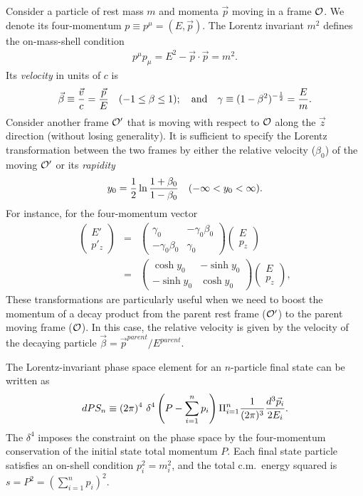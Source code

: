 \documentclass[prd,aps,floats,preprintnumbers,preprint,superscriptaddress,floatfix,nofootinbib]{revtex4}
\def\vp{{\vec p}}
\def\cO{{\cal O}}
\def\be{\begin{equation}}
\def\ee{\end{equation}}
\def\bea{\begin{eqnarray}}
\def\eea{\end{eqnarray}}
\begin{document}
Consider a particle of  rest mass $m$ and momenta $\vp$ 
moving in a frame $\cO$. 
We denote its four-momentum $p\equiv p^\mu=(E,\vp)$. 
The Lorentz invariant $m^2$ defines the on-mass-shell condition 
\bea
p^\mu p_\mu = E^2- \vec p \cdot \vec p = m^2.
\eea
Its {\it velocity} in units of $c$ is 
\bea
\vec\beta \equiv {\vec v\over c} = {\vec p\over E}\quad (-1 \le \beta \le 1);\quad
{\rm and}\quad \gamma \equiv (1-\beta^2)^{-{1\over2}} = {E\over m} .
\eea
Consider another frame $\cO'$ that is moving with respect to $\cO$ 
along the $\vec z$ direction (without losing generality). It 
is sufficient to specify the Lorentz transformation between the two frames
by either the relative  velocity  ($\beta_0$) of the moving $\cO'$
or its {\it rapidity}
\bea
\label{rapid}
y_0={1\over 2}\ln{1+\beta_0 \over 1-\beta_0 }\quad (-\infty < y_0 < \infty).
\eea
%
For instance, for the four-momentum vector
\bea
\nonumber
\label{trans}
\left(  
\begin{array}{l}
E' \\
 p'_z
\end{array}
\right)  & = &
\left(  
\begin{array}{ll}
\gamma_0 & -\gamma_0 \beta_0 \\
-\gamma_0 \beta_0 & \gamma_0
\end{array} 
\right) 
\left(  
\begin{array}{l}
E \\
 p_z
\end{array}
\right) \\
& = &
\left(  
\begin{array}{ll}
\cosh y_0 & -\sinh y_0 \\
-\sinh y_0 & \cosh y_0
\end{array}
\right)
\left(  
\begin{array}{l}
E \\
 p_z
\end{array}
\right),
\label{lor}
\eea
These transformations are particularly
useful when we need to boost the momentum of a decay product from the
parent rest frame ($\cO'$) to the parent moving frame ($\cO$). In this case,
the relative velocity is given by the velocity of the decaying particle
$\vec\beta = \vp^{parent}/E^{parent}$.

The Lorentz-invariant phase space element  for an $n$-particle final state 
can be written as 
\be
dPS_n \equiv (2\pi)^4\ 
\delta^4\left(P-\sum_{i=1}^n p_i \right) \Pi_{i=1}^n {1\over (2\pi)^3}
{d^3\vec p_i\over 2E_i} .
\ee
The $\delta^4$ imposes the constraint on the phase space by the four-momentum
conservation of the initial state total momentum $P$. 
Each final state particle satisfies an on-shell condition $p_i^2 = m_i^2$,
and the total c.m.~energy squared is $s=P^2 =\left(\sum_{i=1}^n p_i \right)^2.$
\end{document}

